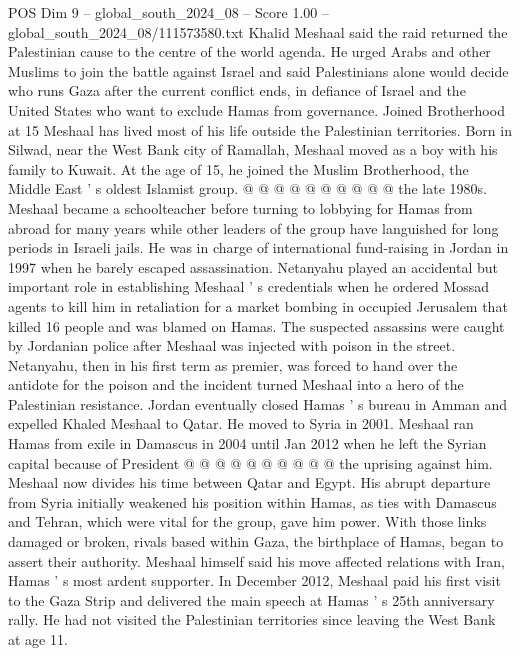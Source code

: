 \begin{textsample}{POS Dim 9 – global\_south\_2024\_08 – Score 1.00 – global\_south\_2024\_08/111573580.txt}
Khalid Meshaal said the raid returned the Palestinian cause to the centre of the world agenda.
He urged Arabs and other Muslims to join the battle against Israel and said Palestinians alone would decide who runs Gaza after the current conflict ends, in defiance of Israel and the United States who want to exclude Hamas from governance.
Joined Brotherhood at 15 Meshaal has lived most of his life outside the Palestinian territories.
Born in Silwad, near the West Bank city of Ramallah, Meshaal moved as a boy with his family to Kuwait.
At the age of 15, he joined the Muslim Brotherhood, the Middle East ' s oldest Islamist group. @ @ @ @ @ @ @ @ @ @ the late 1980s.
Meshaal became a schoolteacher before turning to lobbying for Hamas from abroad for many years while other leaders of the group have languished for long periods in Israeli jails.
He was in charge of international fund-raising in Jordan in 1997 when he barely escaped assassination.
Netanyahu played an accidental but important role in establishing Meshaal ' s credentials when he ordered Mossad agents to kill him in retaliation for a market bombing in occupied Jerusalem that killed 16 people and was blamed on Hamas.
The suspected assassins were caught by Jordanian police after Meshaal was injected with poison in the street.
Netanyahu, then in his first term as premier, was forced to hand over the antidote for the poison and the incident turned Meshaal into a hero of the Palestinian resistance.
Jordan eventually closed Hamas ' s bureau in Amman and expelled Khaled Meshaal to Qatar.
He moved to Syria in 2001.
Meshaal ran Hamas from exile in Damascus in 2004 until Jan 2012 when he left the Syrian capital because of President @ @ @ @ @ @ @ @ @ @ the uprising against him.
Meshaal now divides his time between Qatar and Egypt.
His abrupt departure from Syria initially weakened his position within Hamas, as ties with Damascus and Tehran, which were vital for the group, gave him power.
With those links damaged or broken, rivals based within Gaza, the birthplace of Hamas, began to assert their authority.
Meshaal himself said his move affected relations with Iran, Hamas ' s most ardent supporter.
In December 2012, Meshaal paid his first visit to the Gaza Strip and delivered the main speech at Hamas ' s 25th anniversary rally.
He had not visited the Palestinian territories since leaving the West Bank at age 11.

\end{textsample}
